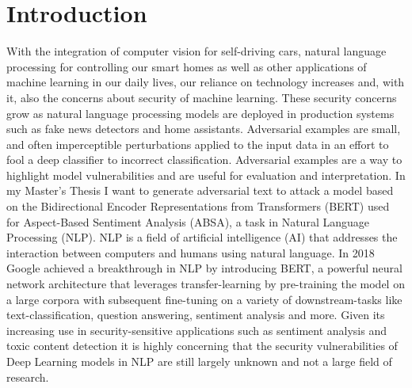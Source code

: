 

\section{Introduction}


With the integration of computer vision for self-driving cars, natural language processing for controlling our smart homes as well as other applications of machine learning in our daily lives, our reliance on technology increases and, with it, also the concerns about security of machine learning. These security concerns grow as natural language processing models are deployed in production systems such as fake news detectors and home assistants. Adversarial examples are small, and often imperceptible perturbations applied to the input data in an effort to fool a deep classifier to incorrect classification.
Adversarial examples are a way to highlight model vulnerabilities and are useful for evaluation and interpretation. 
In my Master's Thesis I want to generate adversarial text to attack a model based on the Bidirectional Encoder Representations from Transformers (BERT) used for Aspect-Based Sentiment Analysis (ABSA), a task in Natural Language Processing (NLP). NLP is a field of artificial intelligence (AI) that addresses the interaction between computers and humans using natural language. In 2018 Google achieved a breakthrough in NLP by introducing BERT, a powerful neural network architecture that leverages transfer-learning by pre-training the model on a large corpora with subsequent fine-tuning on a variety of downstream-tasks like text-classification, question answering, sentiment analysis and more. 
Given its increasing use in security-sensitive applications such as sentiment analysis and toxic content detection it is highly concerning that the security vulnerabilities of Deep Learning models in NLP are still largely unknown and not a large field of research.

